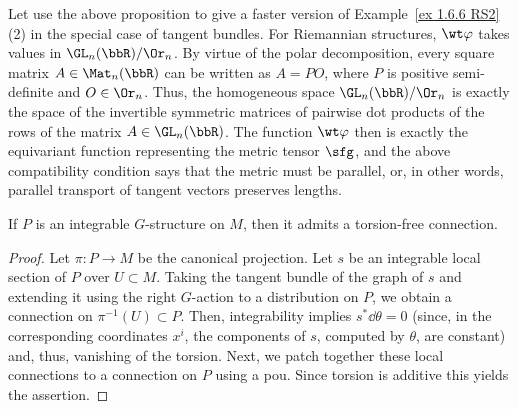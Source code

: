 \begin{example}
    Let use the above proposition to give a faster version of Example~\ref{ex 1.6.6 RS2}(2) in the special case of tangent bundles. For Riemannian structures, $\wt\varphi$ takes values in $\GL_n(\bbR)\slash\Or_n$. By virtue of the polar decomposition, every square matrix $A\in \Mat_n(\bbR)$ can be written as $A=PO$, where $P$ is positive semi-definite and $O\in \Or_n$. Thus, the homogeneous space $\GL_n(\bbR)\slash\Or_n$ is exactly the space of the invertible symmetric matrices of pairwise dot products of the rows of the matrix $A\in \GL_n(\bbR)$. The function $\wt\varphi$ then is exactly the equivariant function representing the metric tensor $\sfg$, and the above compatibility condition says that the metric must be parallel, or, in other words, parallel transport of tangent vectors preserves lengths. 
\end{example} 


\begin{prop}[{{\cite[Prop.~2.2.4]{RS2}}}]\label{prop 2.2.4 RS2}
    If $P$ is an integrable $G$-structure on $M$, then it admits a torsion-free connection.
\end{prop}
\begin{proof}
    Let $\pi:P\to M$ be the canonical projection. Let $s$ be an integrable local section of $P$ over $U\subset M$. Taking the tangent bundle of the graph of $s$ and extending it using the right $G$-action to a distribution on $P$, we obtain a connection on $\pi^{-1}(U)\subset P$. Then, integrability implies $s^\ast \dd\theta=0$ (since, in the corresponding coordinates $x^i$, the components of $s$, computed by $\theta$, are constant) and, thus, vanishing of the torsion. Next, we patch together these local connections to a connection on $P$ using a \gls{pou}. Since torsion is additive this yields the assertion.
\end{proof}

